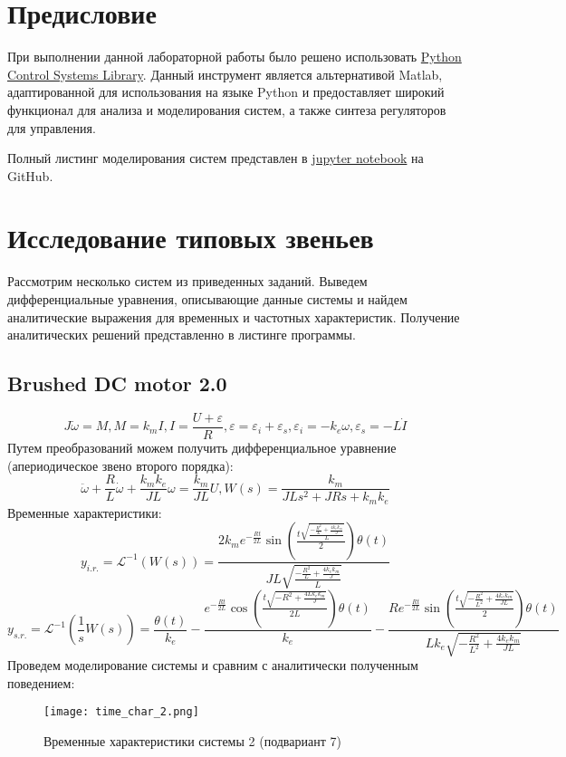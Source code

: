 \tableofcontents
\section*{Предисловие}
При выполнении данной лабораторной работы было решено использовать 
\href{https://python-control.readthedocs.io/en/0.9.4/}{Python Control Systems Library}.
Данный инструмент является альтернативой Matlab, адаптированной для использования на 
языке Python и предоставляет широкий функционал для анализа и моделирования систем,
а также синтеза регуляторов для управления.

Полный листинг моделирования систем представлен в \href{https://github.com/diuzhevVlad/control-theory-itmo-fall-2023/blob/main/Lab4/Lab4.ipynb}{jupyter notebook} на GitHub.

\pagebreak

\section{Исследование типовых звеньев}
Рассмотрим несколько систем из приведенных заданий. Выведем дифференциальные уравнения, описывающие данные 
системы и найдем аналитические выражения для временных и частотных характеристик. Получение аналитических решений представленно
в листинге программы.
\subsection*{Brushed DC motor 2.0}
\begin{equation}
    J \dot{\omega} = M, M = k_m I, I = \frac{U+\varepsilon}{R}, \varepsilon = \varepsilon_i + \varepsilon_s, \varepsilon_i=-k_e \omega, \varepsilon_s=-L\dot{I}
\end{equation}
Путем преобразований можем получить дифференциальное уравнение (апериодическое звено второго порядка):
\begin{equation*}
    \ddot{\omega} + \frac{R}{L}\dot{\omega}+\frac{k_mk_e}{JL}\omega = \frac{k_m}{JL}U, W(s)=\frac{k_m}{JLs^2 + JRs + k_mk_e}
\end{equation*}
Временные характеристики:
\begin{equation*}
    y_{i.r.}=\mathcal{L}^{-1}(W(s)) = \frac{2 k_{m} e^{- \frac{R t}{2 L}} \sin{(\frac{t \sqrt{\frac{- \frac{R^{2}}{L} + \frac{4 k_{e} k_{m}}{J}}{L}}}{2} )} \theta(t)}{J L \sqrt{\frac{- \frac{R^{2}}{L} + \frac{4 k_{e} k_{m}}{J}}{L}}}
\end{equation*}
\begin{equation*}
    y_{s.r.}=\mathcal{L}^{-1}(\frac{1}{s}W(s)) = \frac{\theta(t)}{k_{e}} - \frac{e^{- \frac{R t}{2 L}} \cos{(\frac{t \sqrt{- R^{2} + \frac{4 L k_{e} k_{m}}{J}}}{2 L} )} \theta(t)}{k_{e}} - \frac{R e^{- \frac{R t}{2 L}} \sin{(\frac{t \sqrt{- \frac{R^{2}}{L^{2}} + \frac{4 k_{e} k_{m}}{J L}}}{2} )} \theta(t)}{L k_{e} \sqrt{- \frac{R^{2}}{L^{2}} + \frac{4 k_{e} k_{m}}{J L}}}
\end{equation*}
Проведем моделирование системы и сравним с аналитически полученным поведением:
\begin{figure}[h]
    \centering
    \texttt{[image: time\_char\_2.png]}
    \caption{\label{fig:The-caption-1}Временные характеристики системы 2 (подвариант 7)}
\end{figure}

